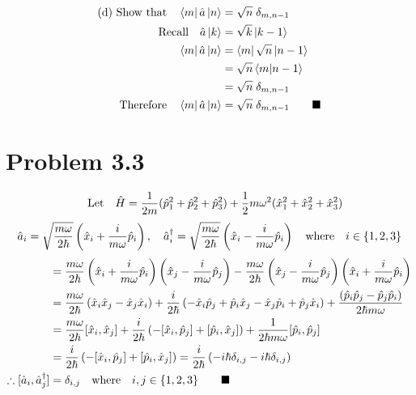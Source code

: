 \documentclass{amsart}
\begin{document}
\begin{align*}
    \qq*{(d) Show that}\bra{m}\hat{a}\ket{n} &=\sqrt{n}\;\delta_{m,n-1}\\
    \qq{Recall}\hat{a}\ket{k}&=\sqrt{k}\ket{k-1}\\
    \bra{m}\hat{a}\ket{n} &= \bra{m}\sqrt{n}\ket{n-1}\\
    &= \sqrt{n}\bra{m}\ket{n-1}\\
    &=\sqrt{n}\;\delta_{m,n-1}\\
    \qq{Therefore}\bra{m}\hat{a}\ket{n}  &=\sqrt{n}\;\delta_{m,n-1}\qquad\blacksquare
\end{align*}

\section*{Problem 3.3}
\[\qq{Let}\hat{H}=\frac{1}{2m}(\hat{p}^2_1+\hat{p}^2_2+\hat{p}^2_3) + \frac{1}{2}m\omega^2(\hat{x}^2_1+\hat{x}^2_2+\hat{x}^2_3) \]
\[\hat{a}_i=\sqrt{\frac{m\omega}{2\hbar}}\left(\hat{x}_i+\frac{i}{m\omega}\hat{p}_i\right)\qcomma\hat{a}^\dagger_i=\sqrt{\frac{m\omega}{2\hbar}}\left(\hat{x}_i-\frac{i}{m\omega}\hat{p}_i\right)\qq{where}i\in\{1,2,3\}\]
\begin{align*}
    [\hat{a}_i,\hat{a}^\dagger_j]&=\frac{m\omega}{2\hbar}\left(\hat{x}_i+\frac{i}{m\omega}\hat{p}_i\right)\left(\hat{x}_j-\frac{i}{m\omega}\hat{p}_j\right)-\frac{m\omega}{2\hbar}\left(\hat{x}_j-\frac{i}{m\omega}\hat{p}_j\right)\left(\hat{x}_i+\frac{i}{m\omega}\hat{p}_i\right)\\
    &=\frac{m\omega}{2\hbar}\left(\hat{x}_i\hat{x}_j-\hat{x}_j\hat{x}_i\right)+\frac{i}{2\hbar}\left(-\hat{x}_i\hat{p}_j+\hat{p}_i\hat{x}_j-\hat{x}_j\hat{p}_i+\hat{p}_j\hat{x}_i\right)+\frac{\left(\hat{p}_i\hat{p}_j-\hat{p}_j\hat{p}_i\right)}{2\hbar m\omega}\\
    &=\frac{m\omega}{2\hbar}[\hat{x}_i,\hat{x}_j]+\frac{i}{2\hbar}\left(-[\hat{x}_i,\hat{p}_j]+[\hat{p}_i,\hat{x}_j]\right)+\frac{1}{2\hbar m\omega}[\hat{p}_i,\hat{p}_j]\\
    &=\frac{i}{2\hbar}\left(-[\hat{x}_i,\hat{p}_j]+[\hat{p}_i,\hat{x}_j]\right)=\frac{i}{2\hbar}\left(-i\hbar\delta_{i,j}-i\hbar\delta_{i,j}\right)\\
    \therefore[\hat{a}_i,\hat{a}^\dagger_j]&=\delta_{i,j}\qq{where}i,j\in\{1,2,3\}\qquad\blacksquare
\end{align*}
\end{document}
